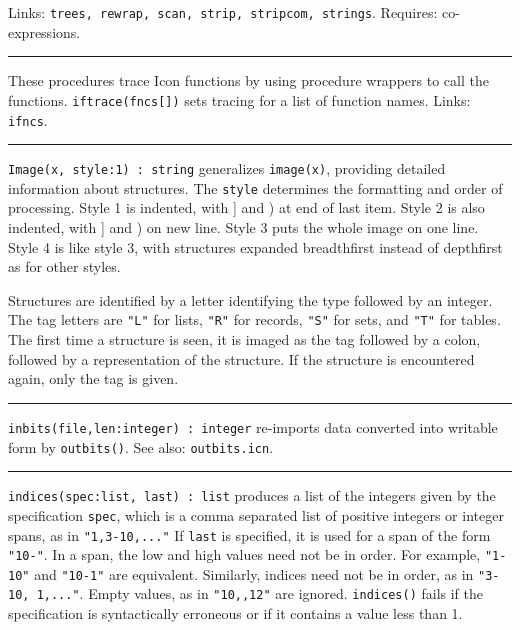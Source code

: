 Links: \texttt{trees, rewrap, scan, strip, stripcom, strings}. Requires:
co-expressions.

\vspace{0.25cm}\hrule{}

These procedures trace Icon functions by using procedure
wrappers to call the functions. \texttt{iftrace(fncs[])} sets tracing for a list
of function names. Links: \texttt{ifncs}.

\vspace{0.25cm}\hrule{}

\texttt{Image(x, style:1) : string} generalizes
\texttt{image(x)}, providing detailed information about structures. The
\texttt{style} determines the formatting and order of
processing. Style 1 is indented, with ] and ) at end of last item.
Style 2 is also indented, with ] and ) on new line. Style 3 puts the
whole image on one line. Style 4 is like style 3, with structures
expanded breadthfirst instead of depthfirst as for other styles.

Structures are identified by a letter identifying the type followed by
an integer. The tag letters are \texttt{"L"} for lists,
\texttt{"R"} for records, \texttt{"S"} for sets, and
\texttt{"T"} for tables. The first time a structure
is seen, it is imaged as the tag followed by a colon, followed
by a representation of the structure. If the structure is
encountered again, only the tag is given.

\vspace{0.25cm}\hrule{}

\texttt{inbits(file,len:integer) : integer} re-imports data converted
into writable form by \texttt{outbits()}. See also:
\texttt{outbits.icn}.

\vspace{0.25cm}\hrule{}

\texttt{indices(spec:list, last) : list} produces a list of the integers
given by the specification \texttt{spec}, which is a comma separated
list of positive integers or integer spans, as in
\texttt{"1,3-10,..."} If \texttt{last} is
specified, it is used for a span of the form
\texttt{"10-"}. In a span, the low and high
values need not be in order. For example,
\texttt{"1-10"} and
\texttt{"10-1"} are equivalent. Similarly,
indices need not be in order, as in \texttt{"3-10,
1,..."}. Empty values, as in
\texttt{"10,,12"} are ignored.
\texttt{indices()} fails if the specification is syntactically
erroneous or if it contains a value less than 1. 


